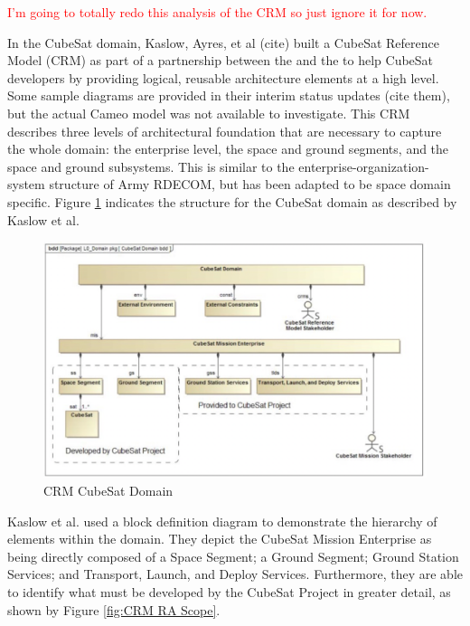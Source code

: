 \textcolor{red}{I'm going to totally redo this analysis of the CRM so just ignore it for now.}

In the CubeSat domain, Kaslow, Ayres, et al (cite) built a CubeSat Reference Model (CRM) as part of a partnership between the  and the  to help CubeSat developers by providing logical, reusable architecture elements at a high level. Some sample diagrams are provided in their interim status updates (cite them), but the actual Cameo model was not available to investigate. This CRM describes three levels of architectural foundation that are necessary to capture the whole domain: the enterprise level, the space and ground segments, and the space and ground subsystems. This is similar to the enterprise-organization-system structure of Army RDECOM, but has been adapted to be space domain specific.  Figure \ref{fig:CRM Domain} indicates the structure for the CubeSat domain as described by Kaslow et al.

\begin{figure}[!h]
    \centering
    \includegraphics[width=\textwidth]{Thesis/Literature_Review/Lit Review Figures/CubeSat Domain.png}
    \caption{CRM CubeSat Domain}
    \label{fig:CRM Domain}
\end{figure}

Kaslow et al. used a block definition diagram to demonstrate the hierarchy of elements within the domain. They depict the CubeSat Mission Enterprise as being directly composed of a Space Segment; a Ground Segment; Ground Station Services; and Transport, Launch, and Deploy Services. Furthermore, they are able to identify what must be developed by the CubeSat Project in greater detail, as shown by Figure \ref{fig:CRM RA Scope}.


